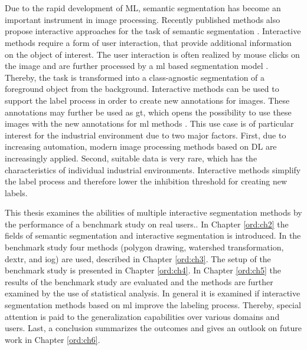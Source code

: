 \chapter{\abstractname}


Due to the rapid development of ML, semantic segmentation has become an important instrument in image processing.
Recently published methods also propose interactive approaches for the task of semantic segmentation \cite{Xu16-InteractiveObjectSelection} \cite{JG18-ClickCarving} \cite{Liew17-RegionalInteractiveImageSeg}.
Interactive methods require a form of user interaction, that provide additional information on the object of interest.
The user interaction is often realized by mouse clicks on the image and are further processed by a \gls{ml} based segmentation model \cite{Man18-DEXTR} \cite{Zha20-IOG}. 
Thereby, the task is transformed into a class-agnostic segmentation of a foreground object from the background.
Interactive methods can be used to support the label process in order to create new annotations for images.
These annotations may further be used as \gls{gt}, which opens the possibility to use these images with the new annotations for \gls{ml} methods \cite{Man18-DEXTR}.
This use case is of particular interest for the industrial environment due to two major factors.
First, due to increasing automation, modern image processing methods based on DL are increasingly applied.
Second, suitable data is very rare, which has the characteristics of individual industrial environments.
Interactive methods simplify the label process and therefore lower the inhibition threshold for creating new labels.

This thesis examines the abilities of multiple interactive segmentation methods by the performance of a benchmark study on real users..
In Chapter \ref{ord:ch2} the fields of semantic segmentation and interactive segmentation is introduced.
In the benchmark study four methods (polygon drawing, watershed transformation, \gls{dextr}\cite{Man18-DEXTR}, and \gls{iog}\cite{Zha20-IOG}) are used, described in Chapter \ref{ord:ch3}.
The setup of the benchmark study is presented in Chapter \ref{ord:ch4}.
In Chapter \ref{ord:ch5} the results of the benchmark study are evaluated and the methods are further examined by the use of statistical analysis.
In general it is examined if interactive segmentation methods based on \gls{ml} improve the labeling process.
Thereby, special attention is paid to the generalization capabilities over various domains and users.
Last, a conclusion summarizes the outcomes and gives an outlook on future work in Chapter \ref{ord:ch6}.


